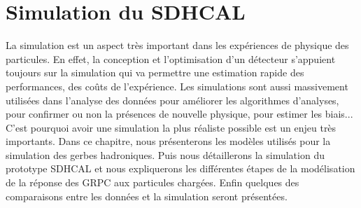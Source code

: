 \chapter{Simulation du SDHCAL}
La simulation est un aspect très important dans les expériences de physique des particules. En effet, la conception et l'optimisation d'un détecteur s'appuient toujours sur la simulation qui va permettre une estimation rapide des performances, des coûts de l'expérience. Les simulations sont aussi massivement utilisées dans l'analyse des données pour améliorer les algorithmes d'analyses, pour confirmer ou non la présences de nouvelle physique, pour estimer les biais... C'est pourquoi avoir une simulation la plus réaliste possible est un enjeu très importants. Dans ce chapitre, nous présenterons les modèles utilisés pour la simulation des gerbes hadroniques. Puis nous détaillerons la simulation du prototype SDHCAL et nous expliquerons les différentes étapes de la modélisation de la réponse des GRPC aux particules chargées. Enfin quelques des comparaisons entre les données et la simulation seront présentées. 
\minitoc
\newpage


